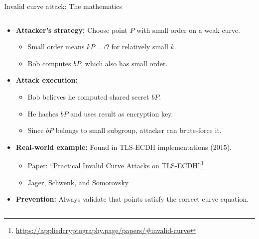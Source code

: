 \documentclass[aspectratio=169, lualatex, handout]{beamer}
\begin{document}
\begin{frame}{Invalid curve attack: The mathematics}
	\begin{columns}[c]
		\begin{column}{1\textwidth}
			\begin{itemize}[<+->]
				\item \textbf{Attacker's strategy:} Choose point $P$ with small order on a weak curve.
				      \begin{itemize}
					      \item Small order means $kP = \mathcal{O}$ for relatively small $k$.
					      \item Bob computes $bP$, which also has small order.
				      \end{itemize}
				\item \textbf{Attack execution:}
				      \begin{itemize}
					      \item Bob believes he computed shared secret $bP$.
					      \item He hashes $bP$ and uses result as encryption key.
					      \item Since $bP$ belongs to small subgroup, attacker can brute-force it.
				      \end{itemize}
				\item \textbf{Real-world example:} Found in TLS-ECDH implementations (2015).
				      \begin{itemize}
					      \item Paper: ``Practical Invalid Curve Attacks on TLS-ECDH''\footnote{\url{https://appliedcryptography.page/papers/\#invalid-curve}}
					      \item Jager, Schwenk, and Somorovsky
				      \end{itemize}
				\item \textbf{Prevention:} Always validate that points satisfy the correct curve equation.
			\end{itemize}
		\end{column}
	\end{columns}
\end{frame}
\end{document}
